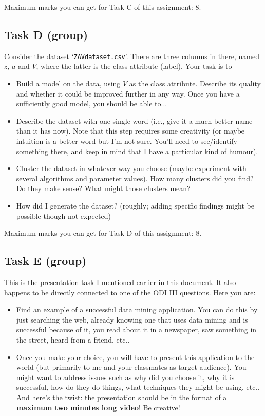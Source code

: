 \documentclass{llncs}
\begin{document}
Maximum marks you can get for Task C of this assignment: 8.

\subsection{Task D (group)}
Consider the dataset `\texttt{ZAVdataset.csv}'. There are three columns in there, named $z$, $a$ and $V$, where the latter is the class attribute (label). Your task is to
\begin{itemize}
	\item Build a model on the data, using $V$ as the class attribute. Describe its quality and whether it could be improved further in any way. Once you have a sufficiently good model, you should be able to...
	\item Describe the dataset with one single word (i.e., give it a much better name than it has now). Note that this step requires some creativity (or maybe intuition is a better word but I'm not sure. You'll need to see/identify something there, and keep in mind that I have a particular kind of humour).
	\item Cluster the dataset in whatever way you choose (maybe experiment with several algorithms and parameter values). How many clusters did you find? Do they make sense? What might those clusters mean?
	\item How did I generate the dataset? (roughly; adding specific findings might be possible though not expected)
\end{itemize}

Maximum marks you can get for Task D of this assignment: 8.

\subsection{Task E (group)}
This is the presentation task I mentioned earlier in this document. It also happens to be directly connected to one of the ODI III questions. Here you are:
\begin{itemize}
	\item Find an example of a successful data mining application. You can do this by just searching the web, already knowing one that uses data mining and is successful because of it, you read about it in a newspaper, saw something in the street, heard from a friend, etc..
	\item Once you make your choice, you will have to present this application to the world (but primarily to me and your classmates as target audience). You might want to address issues such as why did you choose it, why it is successful, how do they do things, what techniques they might be using, etc.. And here's the twist: the presentation should be in the format of a \textbf{maximum two minutes long video}! Be creative!
\end{itemize}
\end{document}
